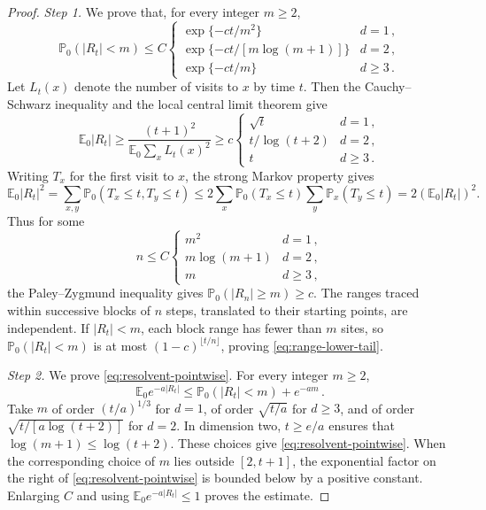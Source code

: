 \documentclass[11pt]{amsart}
\theoremstyle{plain}
\theoremstyle{definition}
\newcommand{\E}{\mathbb{E}}
\renewcommand{\P}{\mathbb{P}}
\begin{document}
\begin{proof}
	\smallskip
	\noindent\emph{Step 1.} We prove that, for every integer $m\geq2$,
	\begin{equation}\label{eq:range-lower-tail}
		\P_0(|R_t|<m)\leq C
		\begin{cases}
			\exp\{-ct/m^2\}&d=1\,,\\
			\exp\{-ct/[m\log(m+1)]\}&d=2\,,\\
			\exp\{-ct/m\}&d\geq3\,.
		\end{cases}
	\end{equation}
	Let $L_t(x)$ denote the number of visits to $x$ by time $t$. Then
	the Cauchy--Schwarz inequality and the local central limit theorem give
	\[
		\E_0|R_t|\geq\frac{(t+1)^2}{\E_0\sum_xL_t(x)^2}
		\geq c
		\begin{cases}
			\sqrt t&d=1\,,\\ t/\log(t+2)&d=2\,,\\ t&d\geq3\,.
		\end{cases}
	\]
	Writing $T_x$ for the first visit to $x$, the strong Markov property gives
	\[
		\E_0|R_t|^2
		=\sum_{x,y}\P_0(T_x\leq t,T_y\leq t)
		\leq2\sum_x\P_0(T_x\leq t)\sum_y\P_x(T_y\leq t)
		=2(\E_0|R_t|)^2.
	\]
	Thus for some
	\[
		n\leq C
		\begin{cases}
			m^2&d=1\,,\\ m\log(m+1)&d=2\,,\\ m&d\geq3\,,
		\end{cases}
	\]
	the Paley--Zygmund inequality gives $\P_0(|R_n|\geq m)\geq c$. The ranges traced within
	successive blocks of $n$ steps, translated to their starting points, are
	independent. If $|R_t|<m$, each block range has fewer than $m$ sites, so $\P_0(|R_t|<m)$ is at most
	$(1-c)^{\lfloor t/n\rfloor}$, proving \eqref{eq:range-lower-tail}.

	\smallskip
	\noindent\emph{Step 2.} We prove \eqref{eq:resolvent-pointwise}.
	For every integer $m\geq2$,
	\[
		\E_0e^{-a|R_t|}\leq\P_0(|R_t|<m)+e^{-am}\,.
	\]
	Take $m$ of order $(t/a)^{1/3}$ for $d=1$, of order $\sqrt{t/a}$ for
	$d\geq3$, and of order $\sqrt{t/[a\log(t+2)]}$ for $d=2$.
	In dimension two, $t\geq e/a$ ensures that
	$\log(m+1)\leq\log(t+2)$. These choices give
	\eqref{eq:resolvent-pointwise}. When the
	corresponding choice of $m$ lies outside $[2,t+1]$, the exponential factor
	on the right of \eqref{eq:resolvent-pointwise} is bounded below by a positive
	constant. Enlarging $C$ and using $\E_0e^{-a|R_t|}\leq1$ proves the estimate.


\end{proof}
\end{document}
